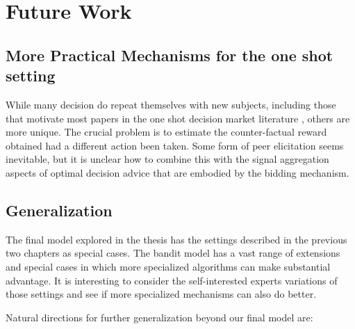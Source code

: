 
\section{Future Work} \label{sec:future}
\subsection{More Practical Mechanisms for the one shot setting}

While many decision do repeat themselves with new subjects, including those that motivate most papers in the one shot decision market literature , others are more unique. 
The crucial problem is to estimate the counter-factual reward obtained had a different action been taken.
Some form of peer elicitation seems inevitable, but it is unclear how to combine this with the signal aggregation aspects of optimal decision advice that are embodied by the bidding mechanism. 


\subsection{Generalization}

The final model explored in the thesis has the settings described in the previous two chapters as special cases.
The bandit model has a vast range of extensions and special cases in which more specialized algorithms can make substantial advantage. It is interesting to consider the self-interested experts variations of those settings and see if more specialized mechanisms can also do better.



Natural directions for further generalization beyond our final model are:

